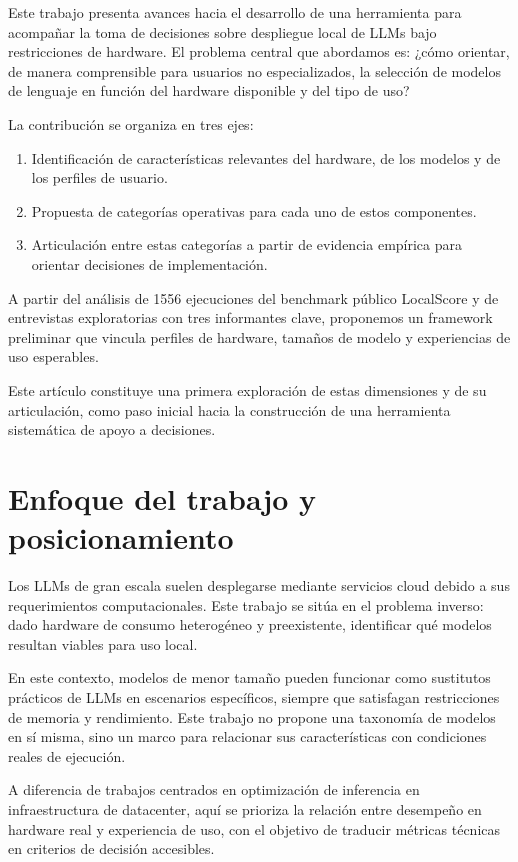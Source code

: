 \documentclass{llncs}
\begin{document}
Este trabajo presenta avances hacia el desarrollo de una herramienta para acompañar la toma de decisiones sobre despliegue local de LLMs bajo restricciones de hardware. El problema central que abordamos es: ¿cómo orientar, de manera comprensible para usuarios no especializados, la selección de modelos de lenguaje en función del hardware disponible y del tipo de uso?

La contribución se organiza en tres ejes:
\begin{enumerate}
    \item Identificación de características relevantes del hardware, de los modelos y de los perfiles de usuario.
    \item Propuesta de categorías operativas para cada uno de estos componentes.
    \item Articulación entre estas categorías a partir de evidencia empírica para orientar decisiones de implementación.
\end{enumerate}

A partir del análisis de 1556 ejecuciones del benchmark público LocalScore y de entrevistas exploratorias con tres informantes clave, proponemos un framework preliminar que vincula perfiles de hardware, tamaños de modelo y experiencias de uso esperables.

Este artículo constituye una primera exploración de estas dimensiones y de su articulación, como paso inicial hacia la construcción de una herramienta sistemática de apoyo a decisiones.

\section{Enfoque del trabajo y posicionamiento}\label{enfoque}

Los LLMs de gran escala suelen desplegarse mediante servicios cloud debido a sus requerimientos computacionales. Este trabajo se sitúa en el problema inverso: dado hardware de consumo heterogéneo y preexistente, identificar qué modelos resultan viables para uso local.

En este contexto, modelos de menor tamaño pueden funcionar como sustitutos prácticos de LLMs en escenarios específicos, siempre que satisfagan restricciones de memoria y rendimiento. Este trabajo no propone una taxonomía de modelos en sí misma, sino un marco para relacionar sus características con condiciones reales de ejecución.

A diferencia de trabajos centrados en optimización de inferencia en infraestructura de datacenter, aquí se prioriza la relación entre desempeño en hardware real y experiencia de uso, con el objetivo de traducir métricas técnicas en criterios de decisión accesibles.
\end{document}
